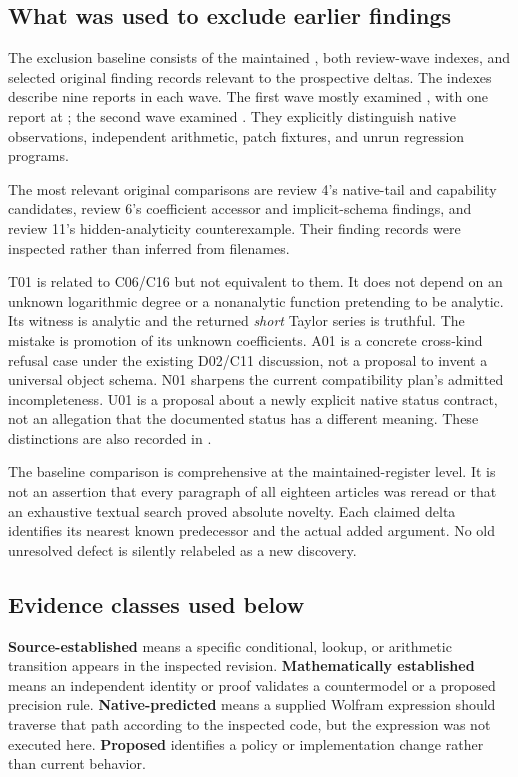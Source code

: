 \documentclass[11pt,letterpaper]{article}
\theoremstyle{definition}\newtheorem{definition}[proposition]{Definition}
\begin{document}
\subsection{What was used to exclude earlier findings}
The exclusion baseline consists of the maintained ,
both review-wave indexes, and selected original finding records relevant to the
prospective deltas. The indexes describe nine reports in each wave. The first
wave mostly examined , with one report at ; the second
wave examined . They explicitly distinguish native observations,
independent arithmetic, patch fixtures, and unrun regression programs.
\cite{register,wave1,wave2}

The most relevant original comparisons are review 4's native-tail and
capability candidates, review 6's coefficient accessor and implicit-schema
findings, and review 11's hidden-analyticity counterexample. Their finding
records were inspected rather than inferred from filenames.
\cite{review4,review6,review11}

T01 is related to C06/C16 but not equivalent to them. It does not depend on an
unknown logarithmic degree or a nonanalytic function pretending to be analytic.
Its witness is analytic and the returned \emph{short} Taylor series is truthful.
The mistake is promotion of its unknown coefficients. A01 is a concrete
cross-kind refusal case under the existing D02/C11 discussion, not a proposal
to invent a universal object schema. N01 sharpens the current compatibility
plan's admitted incompleteness. U01 is a proposal about a newly explicit native
status contract, not an allegation that the documented status has a different
meaning. These distinctions are also recorded in
.

The baseline comparison is comprehensive at the maintained-register level.
It is not an assertion that every paragraph of all eighteen articles was
reread or that an exhaustive textual search proved absolute novelty. Each
claimed delta identifies its nearest known predecessor and the actual added
argument. No old unresolved defect is silently relabeled as a new discovery.

\subsection{Evidence classes used below}
\textbf{Source-established} means a specific conditional, lookup, or arithmetic
transition appears in the inspected revision. \textbf{Mathematically established}
means an independent identity or proof validates a countermodel or a proposed
precision rule. \textbf{Native-predicted} means a supplied Wolfram expression
should traverse that path according to the inspected code, but the expression
was not executed here. \textbf{Proposed} identifies a policy or implementation
change rather than current behavior.
\end{document}
